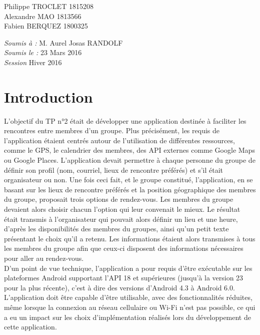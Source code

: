 \documentclass[12pt, a4paper]{article}%
\begin{document}
\begin{titlepage}
\begin{sffamily}
\begin{center}
    \begin{minipage}{0.4\textwidth}
      \begin{flushleft} \large
          Philippe TROCLET \textsc{1815208}\\
          Alexandre  MAO \textsc{1813566}\\
          Fabien  BERQUEZ \textsc{1800325}\\
      \end{flushleft}
    \end{minipage}
    \begin{minipage}{0.4\textwidth}
      \begin{flushright} \large
        \emph{Soumis à :} M. Aurel Josas RANDOLF\\
        \emph{Soumis le :} 23 Mars 2016  \\
        \emph{Session} Hiver 2016 
      \end{flushright}
    \end{minipage}

    \vfill

  \end{center}
  \end{sffamily}
\end{titlepage}%


\section{Introduction}
L'objectif du TP n°2 était de développer une application destinée à faciliter les rencontres entre membres d'un groupe. Plus précisément, les requis de l'application étaient centrés autour de l'utilisation de différentes ressources, comme le GPS, le calendrier des membres, des API externes comme Google Maps ou Google Places. L'application devait permettre à chaque personne du groupe de définir son profil (nom, courriel, lieux de rencontre préférés) et s'il était organisateur ou non. Une fois ceci fait, et le groupe constitué, l'application, en se basant sur les lieux de rencontre préférés et la position géographique des membres du groupe, proposait trois options de rendez-vous. Les membres du groupe devaient alors choisir chacun l'option qui leur convenait le mieux. Le résultat était transmis à l'organisateur qui pouvait alors définir un lieu et une heure, d'après les disponibilités des membres du groupes, ainsi qu'un petit texte présentant le choix qu'il a retenu. Les informations étaient alors transmises à tous les membres du groupe afin que ceux-ci disposent des informations nécessaires pour aller au rendez-vous.\\
D'un point de vue technique, l'application a pour requis d'être exécutable sur les plateformes Android supportant l'API 18 et supérieures (jusqu'à la version 23 pour la plus récente), c'est à dire des versions d'Android 4.3 à Android 6.0. L'application doit être capable d'être utilisable, avec des fonctionnalités réduites, même lorsque la connexion au réseau cellulaire ou Wi-Fi n'est pas possible, ce qui a eu un impact sur les choix d'implémentation réalisés lors du développement de cette application.  
\end{document}
